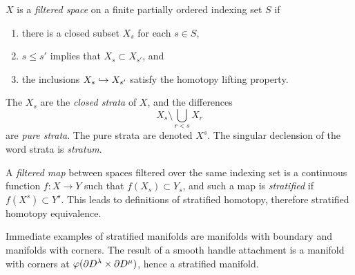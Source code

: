 \begin{defn}[Stratification]
	$X$ is a \emph{filtered space} on a finite partially ordered indexing set $S$ if 
	\begin{enumerate}
		\item there is a closed subset $X_s$ for each $s\in S$,
		\item $s\leq s'$ implies that $X_s\subset X_{s'}$, and
		\item the inclusions $X_s \hookrightarrow X_{s'}$ satisfy the homotopy lifting property.
	\end{enumerate}
	The $X_s$ are the \emph{closed strata} of $X$, and the differences
	$$X_s\setminus \bigcup_{r < s} X_r$$
	are \emph{pure strata}.
	The pure strata are denoted $X^s$.
	The singular declension of the word strata is \emph{stratum}.
	
	A \emph{filtered map} between spaces filtered over the same indexing set is a continuous function $f:X\to Y$ such that $f(X_s)\subset Y_s$, and such a map is \emph{stratified} if $f(X^s) \subset Y^s$.
	This leads to definitions of stratified homotopy, therefore stratified homotopy equivalence.
\end{defn}

Immediate examples of stratified manifolds are manifolds with boundary and manifolds with corners.
The result of a smooth handle attachment is a manifold with corners at $\varphi(\partial D^\lambda \times \partial D^\mu)$, hence a stratified manifold.



